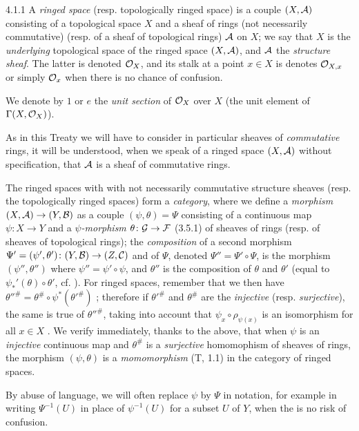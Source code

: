 \documentclass[../main.tex]{subfiles}
\begin{document}
\begin{env}{4.1.1}
A \emph{ringed space} (resp. topologically ringed space) is a couple $(X,\mathcal{A})$
consisting of a topological space $X$ and a sheaf of rings (not necessarily commutative)
(resp. of a sheaf of topological rings) $\mathcal{A}$ on $X$; we say that $X$ is the
\emph{underlying} topological space of the ringed space $(X,\mathcal{A})$, and $\mathcal{A}$
the \emph{structure sheaf}. The latter is denoted $\mathcal{O}_X$, and its stalk at a point
$x\in X$ is denotes $\mathcal{O}_{X,x}$ or simply $\mathcal{O}_x$ when there is no chance of confusion.

We denote by $1$ or $e$ the \emph{unit section} of $\mathcal{O}_X$ over $X$ (the unit element
of $\Gamma(X,\mathcal{O}_X)$).

As in this Treaty we will have to consider in particular sheaves of \emph{commutative}
rings, it will be understood, when we speak of a ringed space $(X,\mathcal{A})$ without
specification, that $\mathcal{A}$ is a sheaf of commutative rings.

The ringed spaces with with not necessarily commutative structure sheaves
(resp. the topologically ringed spaces) form a \emph{category}, where we define
a \emph{morphism} $(X,\mathcal{A})\to(Y,\mathcal{B})$ as a couple $(\psi,\theta)=\Psi$
consisting of a continuous map $\psi\colon X\to Y$ and a \emph{$\psi$-morphism}
$\theta\colon\mathcal{G}\to\mathcal{F}$ (3.5.1) of sheaves of rings (resp. of sheaves of
topological rings); the \emph{composition} of a second morphism
$\Psi'=(\psi',\theta')\colon(Y,\mathcal{B})\to(Z,\mathcal{C})$ and of $\Psi$, denoted
$\Psi''=\Psi'\circ\Psi$, is the morphism $(\psi'',\theta'')$ where $\psi''=\psi'\circ\psi$,
and $\theta''$ is the composition of $\theta$ and $\theta'$ (equal to
$\psi_\ast'(\theta)\circ\theta'$, cf. ). For ringed spaces, remember that we
then have ${\theta''}^\#=\theta^\#\circ\psi^\ast({\theta'}^\#)$ ; therefore
if ${\theta'}^\#$ and $\theta^\#$ are the \emph{injective} (resp. \emph{surjective}),
the same is true of ${\theta''}^\#$, taking into account that $\psi_x\circ\rho_{\psi(x)}$
is an isomorphism for all $x\in X$ . We verify immediately, thanks to the
above, that when $\psi$ is an \emph{injective} continuous map and $\theta^\#$ is
a \emph{surjective} homomophism of sheaves of rings, the morphism $(\psi,\theta)$ is
a \emph{momomorphism} (T, 1.1) in the category of ringed spaces.

By abuse of language, we will often replace $\psi$ by $\Psi$ in notation, for
example in writing $\Psi^{-1}(U)$ in place of $\psi^{-1}(U)$ for a subset $U$ of $Y$,
when the is no risk of confusion.
\end{env}
\end{document}

